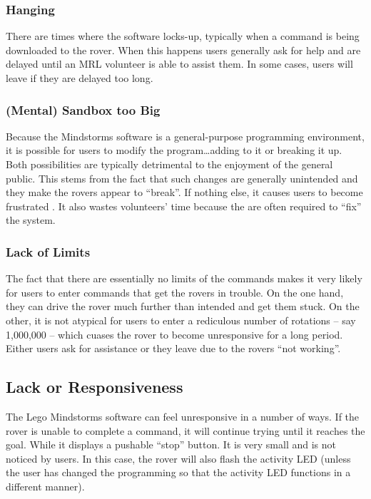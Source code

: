 \documentclass[letterpaper,10pt]{article}
\begin{document}
    \subsubsection{Hanging}
      There are times where the software locks-up, typically when a command is being downloaded to the rover.  When this happens users generally ask for help and are delayed until an MRL volunteer is able to assist them.  In some cases, users will leave if they are delayed too long.
      
    \subsubsection{(Mental) Sandbox too Big}
      Because the Mindstorms software is a general-purpose programming environment, it is possible for users to modify the program\dots{}adding to it or breaking it up.  Both possibilities are typically detrimental to the enjoyment of the general public.  This stems from the fact that such changes are generally unintended and they make the rovers appear to ``break''.  If nothing else, it causes users to become frustrated .  It also wastes volunteers' time because the are often required to ``fix'' the system.
      
    \subsubsection{Lack of Limits}
      The fact that there are essentially no limits of the commands makes it very likely for users to enter commands that get the rovers in trouble.  On the one hand, they can drive the rover much further than intended and get them stuck.  On the other, it is not atypical for users to enter a rediculous number of rotations -- say 1,000,000 -- which cuases the rover to become unresponsive for a long period.  Either users ask for assistance or they leave due to the rovers ``not working''.
      
    \subsection{Lack or Responsiveness}
      The Lego Mindstorms software can feel unresponsive in a number of ways.  If the rover is unable to complete a command, it will continue trying until it reaches the goal.  While it displays a pushable ``stop'' button.  It is very small and is not noticed by users.  In this case, the rover will also flash the activity LED (unless the user has changed the programming so that the activity LED functions in a different manner).  
  
\end{document}
